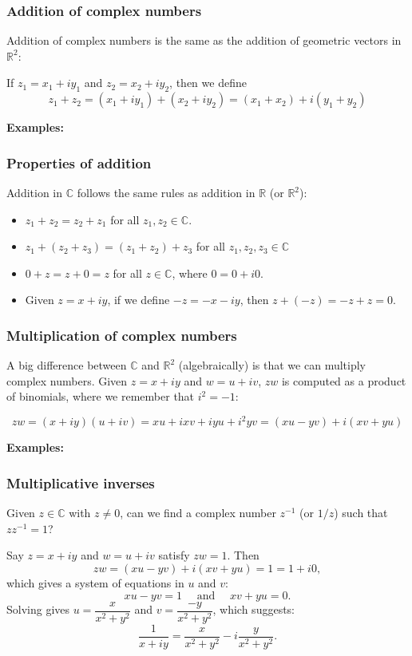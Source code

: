 \documentclass[11pt,t]{beamer}
\newcommand{\R}{\mathbb{R}}
\newcommand{\C}{\mathbb{C}}
\begin{document}
\begin{frame}\frametitle{Addition of complex numbers}
 Addition of complex numbers is the same as the addition of geometric vectors in $\R^2$:

 If $z_1=x_1+iy_1$ and $z_2=x_2+iy_2$, then we define
\[
 z_1+z_2 = (x_1+iy_1)+(x_2+iy_2) = (x_1+x_2)+i(y_1+y_2)
\]

 {\bf Examples:} 

\end{frame}
\begin{frame}\frametitle{Properties of addition}
 Addition in $\C$ follows the same rules as addition in $\R$ (or $\R^2$):

 \begin{itemize}
  \item $z_1+z_2 = z_2+z_1$ for all $z_1,z_2\in\C$.
  \item $z_1+(z_2+z_3) = (z_1+z_2)+z_3$ for all $z_1,z_2,z_3\in \C$
  \item $0+z = z+0=z$ for all $z\in \C$, where $0 = 0 + i0$.
  \item Given $z=x+iy$, if we define $-z = -x-iy$, then $z+(-z)=-z+z=0$.
 \end{itemize}

\end{frame}
\begin{frame}\frametitle{Multiplication of complex numbers}
 A big difference between $\C$ and $\R^2$ (algebraically) is that we can \alert{multiply} complex numbers. Given $z=x+iy$ and $w=u+iv$, $zw$ is computed as a product of binomials, where we remember that $i^2=-1$:

 \[
  zw = (x+iy)(u+iv) = xu+ixv+iyu+i^2yv = (xu-yv)+i(xv+yu)
 \]

{\bf Examples:}

\end{frame}
\begin{frame}\frametitle{Multiplicative inverses}
 Given $z\in\C$ with $z\neq 0$, can we find a complex number $z^{-1}$ (or $1/z$) such that $zz^{-1}=1$?

 Say $z=x+iy$ and $w=u+iv$ satisfy $zw=1$. Then
\[
 zw = (xu-yv)+i(xv+yu) = 1 = 1+i0,
\]
which gives a system of equations in $u$ and $v$:
\[
 xu-yv = 1 \quad \text{ and } \quad xv+yu = 0.
\]
Solving gives $u=\dfrac{x}{x^2+y^2}$ and $v = \dfrac{-y}{x^2+y^2}$, which suggests:
\[
 \frac{1}{x+iy} = \frac{x}{x^2+y^2}-i\frac{y}{x^2+y^2}.
\]

\end{frame}
\end{document}
